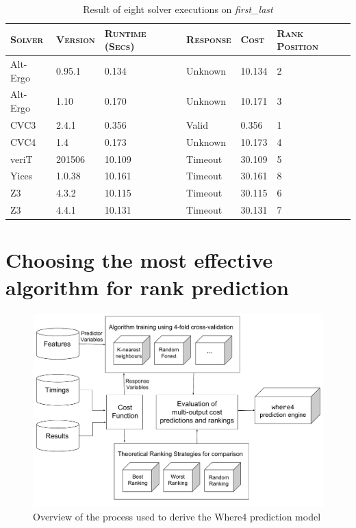 \begin{table}
	\caption[Result of eight solver executions on \textit{first\_last} ]{Result of eight solver executions on \textit{first\_last}}
	\begin{tabularx}{\textwidth}{@{}YZZYZY@{}}
		\toprule
		\textsc{Solver} & \textsc{Version} &  \textsc{Runtime (Secs)} & \textsc{Response} & \textsc{Cost} & \textsc{Rank Position} \\
		\midrule
		Alt-Ergo & 	0.95.1 & 	0.134 & 	Unknown & 	10.134 & 2\\
		Alt-Ergo & 	1.10 & 		0.170 & 	Unknown & 	10.171 & 3\\
		CVC3 & 		2.4.1 & 	0.356 & 	Valid & 	0.356 & 1\\
		CVC4 & 		1.4 &		0.173 & 	Unknown  & 	10.173 & 4\\
		veriT & 	201506 & 	10.109 & 	Timeout & 	30.109 & 5\\
		Yices & 	1.0.38 & 	10.161 & 	Timeout & 	30.161 & 8\\
		Z3 & 		4.3.2 & 	10.115 & 	Timeout & 	30.115 & 6\\
		Z3 & 		4.4.1 & 	10.131 & 	Timeout & 	30.131 & 7\\
		\bottomrule
		
	\end{tabularx}
	\label{table:cost}
\end{table}
 
\section{Choosing the most effective algorithm for rank prediction}
\label{pred:choosing}
\begin{figure}
	\centering
	\includegraphics[width=1.0\linewidth]{Figures/Chapter4}
	\caption{Overview of the process used to derive the \textsf{Where4} prediction model}
	\label{fig:Chapter4}
\end{figure}

